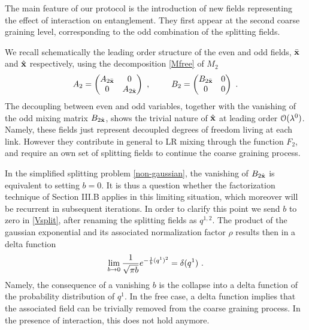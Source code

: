 \documentclass[a4paper,preprintnumbers,nofootinbib,twocolumn]{quantumarticle}
\newcommand{\be}{\begin{equation}} \newcommand{\ee}{\end{equation}}
\begin{document}
The main feature of our protocol is the introduction of new fields representing the effect of interaction on entanglement. 
They first appear at the second coarse graining level, corresponding to the odd combination of the splitting fields.

We recall schematically the leading order structure of the even and odd fields, ${\bar {\bf x}}$ and ${\hat {\bf x}}$ respectively, using the decomposition \eqref{Mfree} of $M_2$
\be
A_2   = \begin{pmatrix} A_{2{\bar {\bf x}}} & 0 \\ 0 & A_{2{\hat {\bf x}}} \end{pmatrix} \ , \;\;\;\;\;\;\;\;\; 
B_2   = \begin{pmatrix} B_{2{\bar {\bf x}}} & 0 \\ 0 & 0 \end{pmatrix} \ .
\label{M22}
\ee
The decoupling between even and odd variables, together with the vanishing of the odd mixing matrix $B_{2{\hat {\bf x}}}$, shows the trivial nature of ${\hat {\bf x}}$ at leading order ${\cal O}(\lambda^0)$.
Namely, these fields just represent decoupled degrees of freedom living at each link. However they contribute in general to LR mixing through the function $F_2$, and require an own set of splitting fields to continue the coarse graining process. 

In the simplified splitting problem \eqref{non-gaussian}, the vanishing of $B_{2{\hat {\bf x}}}$ is equivalent to setting $b=0$.
It is thus a question whether the factorization technique of Section III.B applies in this limiting situation, which moreover will be recurrent in subsequent iterations.
In order to clarify this point we send $b$ to zero in \eqref{Vsplit}, after renaming the splitting fields as $q^{1,2}$. The product of the gaussian 
exponential and its associated  normalization factor $\rho$ results then in a delta function
\be
\lim_{b \to 0}  {1 \over \sqrt{\pi b}} e^{-{1 \over b} (q^1)^2} = \delta(q^1) \ .
\label{delta}
\ee
Namely, the consequence of a vanishing $b$ is the collapse into a delta function of the probability distribution of $q^{1}$.
In the free case, a delta function implies that the associated field can be trivially removed from the coarse graining process. In the presence of interaction, this does not hold
anymore. 
\end{document}
